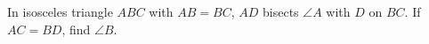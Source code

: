 In isosceles triangle $ABC$ with $AB=BC$, $AD$ bisects $\angle A$ with $D$ on $BC$. If $AC=BD$, find $\angle B$.
